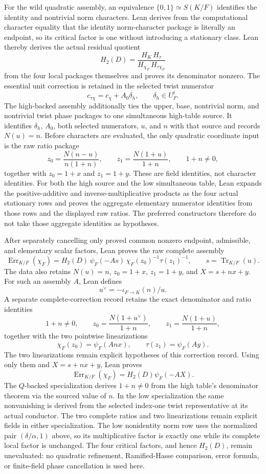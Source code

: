 \begin{definition}
For the wild quadratic assembly, an equivalence
$\{0,1\}\simeq S(K/F)$ identifies the identity and nontrivial norm
characters.  Lean derives from the computational character equality that
the identity norm-character package is literally an endpoint, so its
critical factor is one without introducing a
stationary class.  Lean thereby derives the actual residual quotient
\[
 H_2(D)=
 \frac{H_K\,H_\tau}{H_{\chi_F}\,H_{\tau\chi_F}}
\]
from the four local packages themselves and proves its denominator nonzero.
The essential unit correction is retained in the selected twist numerator
\[
 c_{\tau\chi}=c_\chi+A_0\delta_h,
 \qquad \delta_h\in U_F^t.
\]
The high-backed assembly additionally ties the upper, base, nontrivial norm,
and nontrivial twist phase packages to one simultaneous high-table source.
It identifies $\delta_h$, $A_0$, both selected numerators, $u$, and $n$ with
that source and records $N(u)=n$.
Before characters are evaluated, the only quadratic coordinate input is the
raw ratio package
\[
 z_0=\frac{N(n-u)}{n(1+n)},
 \qquad
 z_1=\frac{N(1+u)}{1+n},
 \qquad 1+n\ne0,
\]
together with $z_0=1+x$ and $z_1=1+y$.  These are field identities, not
character identities.  For both the high source and the low simultaneous
table, Lean expands the positive-additive and inverse-multiplicative products
as the four actual stationary rows and proves the aggregate elementary
numerator identities from those rows and the displayed raw ratios.  The
preferred constructors therefore do not take those aggregate identities as
hypotheses.

After separately cancelling only proved common nonzero endpoint, admissible,
and elementary scalar factors, Lean proves the raw complete assembly
\[
 \operatorname{Err}_{K/F}(\chi_F)=
 H_2(D)\,\psi_F(-As)\,\chi_F(z_0)^{-1}\tau(z_1)^{-1},
 \qquad s=\operatorname{Tr}_{K/F}(u).
\]
The data also retains $N(u)=n$, $z_0=1+x$, $z_1=1+y$, and
$X=s+nx+y$.  For such an assembly $A$, Lean defines
\[
 u^\vee=-\iota_{F\to K}(n)/u.
\]
A separate complete-correction record retains the exact denominator and
ratio identities
\[
 1+n\ne0,\qquad
 z_0=\frac{N(1+u^\vee)}{1+n},\qquad
 z_1=\frac{N(1+u)}{1+n},
\]
together with the two pointwise linearizations
\[
 \chi_F(z_0)=\psi_F(Anx),\qquad
 \tau(z_1)=\psi_F(Ay).
\]
The two linearizations remain explicit hypotheses of this correction record.
Using only them and $X=s+nx+y$, Lean proves
\[
 \operatorname{Err}_{K/F}(\chi_F)=H_2(D)\psi_F(-AX).
\]
The $Q$-backed specialization derives $1+n\ne0$ from the high table's
denominator theorem via the sourced value of $n$.  In the low specialization
the same nonvanishing is derived from the selected index-one twist
representative at its actual conductor.  The two complete ratios and two
linearizations remain explicit fields in either specialization.  The low
nonidentity norm row uses the normalized pair $(\delta/\alpha,1)$ above, so
its multiplicative factor is exactly one while its complete local factor is
unchanged.  The four critical factors, and hence $H_2(D)$, remain unevaluated:
no quadratic refinement,
Ramified-Hasse comparison, error formula, or finite-field phase cancellation
is used here.


\end{definition}
